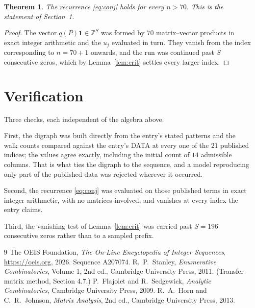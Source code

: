 \documentclass[11pt,a4paper]{article}
\theoremstyle{plain}
\newtheorem{theorem}{Theorem}
\theoremstyle{definition}
\begin{document}
\begin{theorem}
The recurrence \eqref{eq:conj} holds for every $n>70$. This is the statement of
Section~1.
\end{theorem}

\begin{proof}
The vector $q(P)\mathbf{1}\in\mathbb{Z}^{S}$ was formed by $70$ matrix--vector
products in exact integer arithmetic and the $u_j$ evaluated in turn. They vanish from the
index corresponding to $n=70+1$ onwards, and the run was continued past $S$ consecutive
zeros, which by Lemma~\ref{lem:crit} settles every larger index.
\end{proof}

\section{Verification}

Three checks, each independent of the algebra above.

First, the digraph was built directly from the entry's stated patterns and the walk counts
compared against the entry's DATA at every one of the $21$ published indices; the
values agree exactly, including the initial count of $14$ admissible columns. That is
what ties the digraph to the sequence, and a model reproducing only part of the published
data was rejected wherever it occurred.

Second, the recurrence \eqref{eq:conj} was evaluated on those published terms in exact
integer arithmetic, with no matrices involved, and vanishes at every index the entry claims.

Third, the vanishing test of Lemma~\ref{lem:crit} was carried past $S=196$ consecutive
zeros rather than to a sampled prefix.

\begin{thebibliography}{9}
 The OEIS Foundation, \emph{The On-Line Encyclopedia of Integer
Sequences}, \url{https://oeis.org}, 2026. Sequence A207074.
 R.~P.~Stanley, \emph{Enumerative Combinatorics}, Volume 1, 2nd ed.,
Cambridge University Press, 2011. (Transfer-matrix method, Section 4.7.)
 P.~Flajolet and R.~Sedgewick, \emph{Analytic Combinatorics}, Cambridge
University Press, 2009.
 R.~A.~Horn and C.~R.~Johnson, \emph{Matrix Analysis}, 2nd ed., Cambridge
University Press, 2013.
\end{thebibliography}
\end{document}
